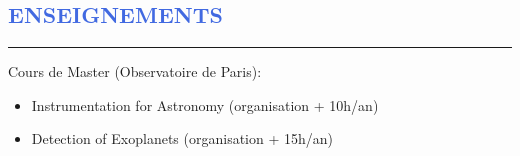 \documentclass[11pt, a4paper, french]{article}
\begin{document}
\vspace{-0.5cm}
\textcolor{RoyalBlue}{\section{\large ENSEIGNEMENTS}
\vspace{-0.2cm}\hrule}
\vspace{0.25cm}
Cours de Master (Observatoire de Paris):
\begin{itemize} \itemsep -2pt
    \item[$\bullet$] Instrumentation for Astronomy (organisation + 10h/an)
    \item[$\bullet$] Detection of Exoplanets (organisation + 15h/an)
\end{itemize}
\end{document}

